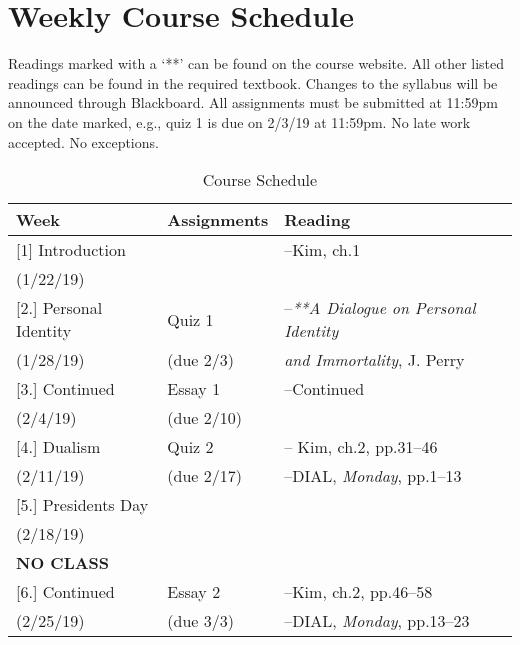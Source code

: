 \documentclass[article,oneside]{memoir}
\begin{document}
\section{Weekly Course Schedule}
Readings marked with a `**' can be found on the course website. All other listed readings can be found in the required textbook. Changes to the syllabus will be announced through Blackboard.  All assignments must be submitted at 11:59pm on the date marked, e.g., quiz 1 is due on 2/3/19 at 11:59pm. No late work accepted. No exceptions.   \newline


\begin{center}
\begin{longtable}{p{4.5cm}p{2cm}p{6cm}}
 
  \caption{Course Schedule} \\
  \toprule
  \textbf{Week} &\textbf{Assignments} & \textbf{Reading} \\
  \midrule

  

[1] Introduction		  		& 	 			& --Kim, ch.1  \\
(1/22/19)					&		  		&    \\ [1.8\baselineskip]

[2.] Personal Identity			& Quiz 1			& --\emph{**A Dialogue on Personal Identity } \\
(1/28/19)			        		& (due 2/3)		& \emph{and Immortality}, J. Perry  \\  [1.8\baselineskip]

[3.] Continued			    	& Essay 1    		&  --Continued  \\
(2/4/19)				         & (due 2/10)		&   \\  [1.8\baselineskip]
	
[4.] Dualism			      	& Quiz 2			& -- Kim, ch.2, pp.31--46\\
(2/11/19)				        	& (due 2/17)		& --DIAL, \emph{Monday}, pp.1--13  \\ [1.8\baselineskip]

[5.] Presidents Day			 & 		&  \\
(2/18/19)				       	 	& 		&\\ 
\textbf{NO CLASS	}		        	& 	& \\  [1.8\baselineskip]

[6.] Continued			      	& Essay 2			& --Kim, ch.2, pp.46--58 \\
(2/25/19)				        	& (due 3/3)		&--DIAL, \emph{Monday}, pp.13--23  \\  [1.8\baselineskip]



\end{longtable}
\end{center}
\end{document}

